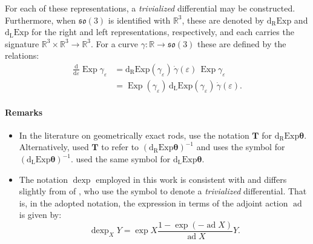 For each of these representations, a \emph{trivialized} differential may
be constructed.
Furthermore, when \(\mathfrak{so}(3)\) is identified with \(\mathbb{R}^3\), these are denoted by
\(\operatorname{d_{\scriptscriptstyle{R}}Exp}\) and
\(\operatorname{d_{\scriptscriptstyle{L}}Exp}\) for the 
right and left
representations, respectively, and each carries the signature
\(\mathbb{R}^3 \times \mathbb{R}^3 \rightarrow \mathbb{R}^3\). 
For a curve \(\gamma: \mathbb{R}\rightarrow \mathfrak{so}(3)\) these are
defined by the relations: 
%
\begin{equation} 
\begin{aligned}
\frac{\mathrm{d}}{\mathrm{d} \varepsilon}
\operatorname{Exp} \gamma_{\varepsilon} 
& =\operatorname{d_{\scriptscriptstyle{R}}Exp}({\gamma_{\varepsilon}})\,\dot{\gamma}(\varepsilon) \,\operatorname{Exp} \gamma_{\varepsilon} \\
& =\operatorname{Exp} (\gamma_{\varepsilon})\, \operatorname{d_{\scriptscriptstyle{L}}Exp}({\gamma_{\varepsilon}}) \, \dot{\gamma}(\varepsilon).
\end{aligned}
\label{eq:def-dExpSO3}
\end{equation}
%
\paragraph*{Remarks}
\begin{itemize}
  \item In the literature on geometrically exact rods, \cite{ibrahimbegović1995computational,ritto-corrêa2002differentiation} use the notation \(\bm{T}\) for 
    \(\operatorname{d_{\scriptscriptstyle{R}}Exp}{\bm{\theta}}\).
      Alternatively, \cite{simo1988dynamics,jelenić1999geometrically} used \(\bm{T}\) to refer to  \(\left(\operatorname{d_{\scriptscriptstyle{R}}Exp}\bm{\theta}\right)^{-1}\) and \cite{simo1991unconditionally} uses the symbol for \(\left(\operatorname{d_{\scriptscriptstyle{L}}Exp}\bm{\theta}\right)^{-1}\).
    \cite{cardona1988beam} used the same symbol for \(\operatorname{d_{\scriptscriptstyle{L}}Exp}\bm{\theta}\).

\item The notation \(\operatorname{dexp}\) employed in this work is consistent with \cite{rossmann2006lie} and differs slightly from of \cite{varadarajan1984lie,iserles2000liegroup}, 
  who use the symbol to denote a \emph{trivialized} differential. 
    That is, in the adopted notation, the expression in terms of the adjoint action \(\operatorname{ad}\)
    is given by: 
    \[
      \operatorname{dexp}_X Y=\exp X \frac{1-\exp (-\operatorname{ad} X)}{\operatorname{ad} X} Y.
    \]
\end{itemize}

